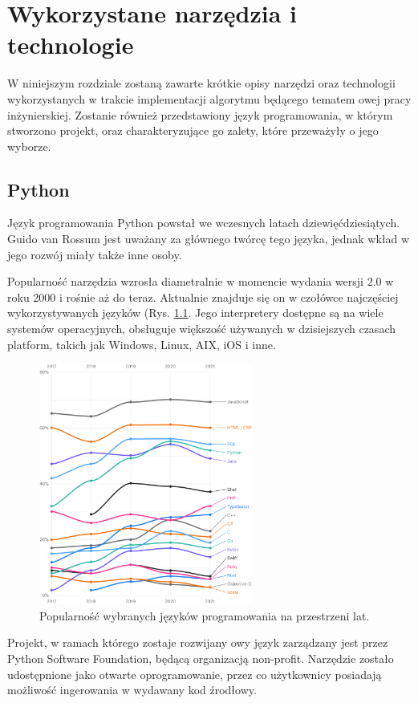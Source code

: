 \chapter{Wykorzystane narzędzia i technologie}
\label{cha:wykorzystaneNarzedziaITechnologie}
W niniejszym rozdziale zostaną zawarte krótkie opisy narzędzi oraz technologii wykorzystanych w trakcie implementacji algorytmu będącego tematem owej pracy inżynierskiej. Zostanie również przedstawiony język programowania, w którym stworzono projekt, oraz charakteryzujące go zalety, które przeważyły o jego wyborze. 
\section{Python}
Język programowania Python \cite{PythonWiki} powstał we wczesnych latach dziewięćdziesiątych. Guido van Rossum jest uważany za głównego twórcę tego języka, jednak wkład w jego rozwój miały także inne osoby. 

Popularność narzędzia wzrosła diametralnie w momencie wydania wersji $2.0$ w roku 2000 i rośnie aż do teraz. Aktualnie znajduje się on w czołówce najczęściej wykorzystywanych języków (Rys. \ref{fig:programmingLang}. Jego interpretery dostępne są na wiele systemów operacyjnych, obsługuje większość używanych w dzisiejszych czasach platform, takich jak Windows, Linux, AIX, iOS i inne.

\begin{figure}[h]
	\centering
	\includegraphics[width=7cm]{zdjęcia/python.png}
	\caption{Popularność wybranych języków programowania na przestrzeni lat.} 
	\label{fig:programmingLang}
\end{figure}

Projekt, w ramach którego zostaje rozwijany owy język zarządzany jest przez Python Software Foundation, będącą organizacją non-profit. Narzędzie zostało udostępnione jako otwarte oprogramowanie, przez co użytkownicy posiadają możliwość ingerowania w wydawany kod źrodłowy.

